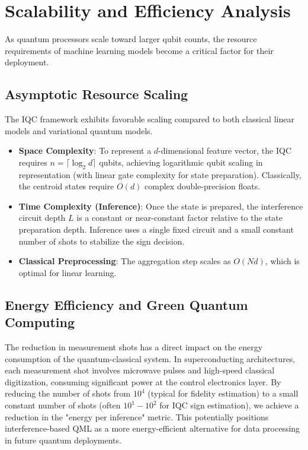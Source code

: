 \documentclass[conference]{IEEEtran}
\begin{document}
\section{Scalability and Efficiency Analysis}

As quantum processors scale toward larger qubit counts, the resource requirements of machine learning models become a critical factor for their deployment.

\subsection{Asymptotic Resource Scaling}

The IQC framework exhibits favorable scaling compared to both classical linear models and variational quantum models. 
\begin{itemize}
    \item \textbf{Space Complexity}: To represent a $d$-dimensional feature vector, the IQC requires $n = \lceil \log_2 d \rceil$ qubits, achieving logarithmic qubit scaling in representation (with linear gate complexity for state preparation). Classically, the centroid states require $O(d)$ complex double-precision floats.
    \item \textbf{Time Complexity (Inference)}: Once the state is prepared, the interference circuit depth $L$ is a constant or near-constant factor relative to the state preparation depth. Inference uses a single fixed circuit and a small constant number of shots to stabilize the sign decision.
    \item \textbf{Classical Preprocessing}: The aggregation step scales as $O(Nd)$, which is optimal for linear learning.
\end{itemize}

\subsection{Energy Efficiency and Green Quantum Computing}

The reduction in measurement shots has a direct impact on the energy consumption of the quantum-classical system. In superconducting architectures, each measurement shot involves microwave pulses and high-speed classical digitization, consuming significant power at the control electronics layer. By reducing the number of shots from $10^4$ (typical for fidelity estimation) to a small constant number of shots (often $10^1-10^2$ for IQC sign estimation), we achieve a reduction in the "energy per inference" metric. This potentially positions interference-based QML as a more energy-efficient alternative for data processing in future quantum deployments.
\end{document}
